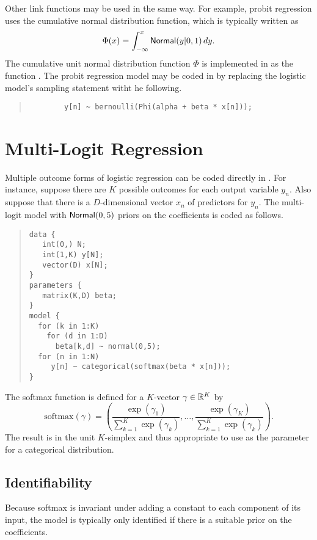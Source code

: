 Other link functions may be used in the same way.  For example, probit
regression uses the cumulative normal distribution function, which is
typically written as 
\[
\Phi(x) = \int_{-\infty}^x \mbox{\sf Normal}(y|0,1) \, dy.
\]
%
The cumulative unit normal distribution function $\Phi$ is implemented
in \Stan as the function .  The probit regression model
may be coded in \Stan by replacing the logistic model's sampling
statement witht he following.
%
\begin{quote}
\begin{Verbatim}
        y[n] ~ bernoulli(Phi(alpha + beta * x[n]));
\end{Verbatim}
\end{quote}

\section{Multi-Logit Regression}

Multiple outcome forms of logistic regression can be coded directly in
\Stan.  For instance, suppose there are $K$ possible outcomes for each
output variable $y_n$.  Also suppose that there is a $D$-dimensional
vector $x_n$ of predictors for $y_n$.  The multi-logit model with
$\mbox{\sf Normal}(0,5)$ priors on the coefficients is coded as follows.
%
\begin{quote}
\begin{Verbatim}
data {
   int(0,) N;
   int(1,K) y[N];
   vector(D) x[N];
}
parameters {
   matrix(K,D) beta;
}
model {
  for (k in 1:K)
    for (d in 1:D)
      beta[k,d] ~ normal(0,5);
  for (n in 1:N)
     y[n] ~ categorical(softmax(beta * x[n]));
}
\end{Verbatim}
\end{quote}
%
The softmax function is defined for a $K$-vector $\gamma \in \mathbb{R}^K$ by
\[
\mbox{softmax}(\gamma) = 
\left(
 \frac{\exp(\gamma_1)}
      {\sum_{k=1}^K \exp(\gamma_k)},
  \ldots,
  \frac{\exp(\gamma_K)}
       {\sum_{k=1}^K \exp(\gamma_k)}
\right).
\]
%
The result is in the unit $K$-simplex and thus appropriate to use as
the parameter for a categorical distribution.

\subsection{Identifiability}

Because softmax is invariant under adding a constant to each component
of its input, the model is typically only identified if there is a
suitable prior on the coefficients.

